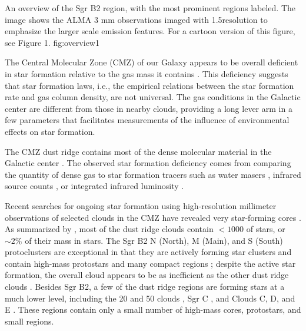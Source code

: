 \documentclass[twocolumn]{aastex61}
\begin{document}
{An overview of the Sgr B2 region, with the most prominent regions labeled.
The image shows the ALMA 3 mm observations imaged with 1.5\arcsec resolution
to emphasize the larger scale emission features.  For a cartoon version of this
figure, see \citet{Schmiedeke2016a} Figure 1.}
{fig:overview}{1}{\textwidth}

The Central Molecular Zone (CMZ) of our Galaxy appears to be overall deficient
in star formation relative to the gas mass it contains
\citep{Beuther2012a,Immer2012a,Longmore2013a,
Kauffmann2016a,Kauffmann2016b,Barnes2017b}.  This deficiency
suggests that star formation laws, i.e., the empirical relations between
the star formation rate and gas column density, are not universal.  The gas
conditions in the Galactic center are different from those in nearby clouds,
providing a long lever arm in a few
parameters \citep[e.g., pressure, temperature, velocity
dispersion;
][]{Kruijssen2013a,Ginsburg2016a,Immer2016a,Shetty2012a,Henshaw2016a} that
facilitates measurements of the influence of environmental effects on star
formation.

The CMZ dust ridge contains most of the dense molecular material in the
Galactic center \citep{Lis1999a,Bally2010a,Molinari2011a}.  The observed star
formation deficiency comes from comparing the quantity of dense gas to  star
formation tracers such as water masers \citep{Longmore2013a}, infrared source
counts \citep{Yusef-Zadeh2009a}, or integrated infrared luminosity
\citep{Barnes2017b}. 

Recent searches for ongoing star formation using high-resolution millimeter
observations of selected clouds in the CMZ have revealed very star-forming
cores
\citep{Johnston2014a,Rathborne2014a,Rathborne2015a,Kauffmann2016a,Kauffmann2016b}.
As summarized by \citet{Barnes2017b}, most of the dust ridge clouds contain
$<1000$ \msun of stars, or $\sim2\%$ of their mass in stars.
The Sgr B2 N (North), M (Main), and S (South) protoclusters \citep[][Figure
\ref{fig:overview}]{Schmiedeke2016a} are exceptional in that they  are actively
forming star clusters and contain high-mass protostars and many compact \hii
regions \citep[e.g.][]{Higuchi2015a,Gaume1995a}; despite the active star formation,
the overall cloud appears to be as inefficient as the other dust ridge clouds
\citep{Barnes2017b}. 
Besides Sgr B2, a few of the dust ridge regions are forming stars at a much
lower level, including the 20 \kms and 50 \kms clouds
\citep{Lu2015b,Lu2016a,2017a}, Sgr C \citep{Kendrew2013a}, and Clouds C, D, and
E \citep[][Walker et al, in prep;]{Ginsburg2015b,Barnes2017b}.  These regions
contain only a small number of high-mass cores, protostars, and small \hii
regions.
\end{document}

